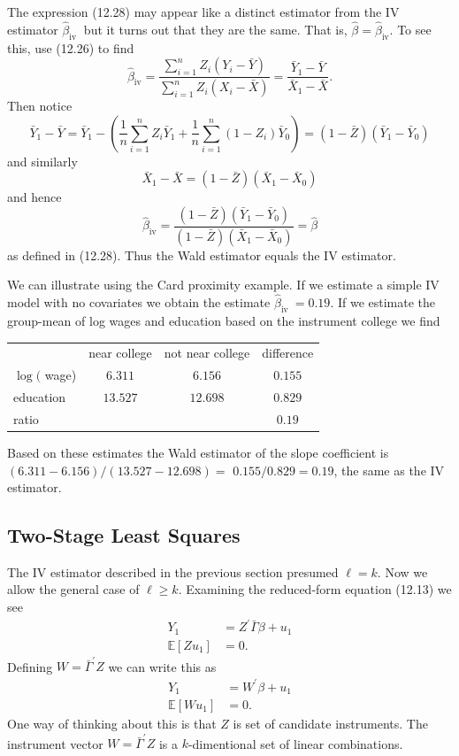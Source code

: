 \documentclass[10pt]{article}
\begin{document}
The expression (12.28) may appear like a distinct estimator from the IV estimator $\widehat{\beta}_{\text {iv }}$ but it turns out that they are the same. That is, $\widehat{\beta}=\widehat{\beta}_{\mathrm{iv}}$. To see this, use (12.26) to find
$$
\widehat{\beta}_{\mathrm{iv}}=\frac{\sum_{i=1}^{n} Z_{i}\left(Y_{i}-\bar{Y}\right)}{\sum_{i=1}^{n} Z_{i}\left(X_{i}-\bar{X}\right)}=\frac{\bar{Y}_{1}-\bar{Y}}{\bar{X}_{1}-\bar{X}} .
$$
Then notice
$$
\bar{Y}_{1}-\bar{Y}=\bar{Y}_{1}-\left(\frac{1}{n} \sum_{i=1}^{n} Z_{i} \bar{Y}_{1}+\frac{1}{n} \sum_{i=1}^{n}\left(1-Z_{i}\right) \bar{Y}_{0}\right)=(1-\bar{Z})\left(\bar{Y}_{1}-\bar{Y}_{0}\right)
$$
and similarly
$$
\bar{X}_{1}-\bar{X}=(1-\bar{Z})\left(\bar{X}_{1}-\bar{X}_{0}\right)
$$
and hence
$$
\widehat{\beta}_{\mathrm{iv}}=\frac{(1-\bar{Z})\left(\bar{Y}_{1}-\bar{Y}_{0}\right)}{(1-\bar{Z})\left(\bar{X}_{1}-\bar{X}_{0}\right)}=\widehat{\beta}
$$
as defined in (12.28). Thus the Wald estimator equals the IV estimator.

We can illustrate using the Card proximity example. If we estimate a simple IV model with no covariates we obtain the estimate $\widehat{\beta}_{\text {iv }}=0.19$. If we estimate the group-mean of log wages and education based on the instrument college we find

\begin{tabular}{lccc}
 & near college & not near college & difference \\
\cline { 3 - 4 }
$\log ($ wage) & $6.311$ & $6.156$ & $0.155$ \\
education & $13.527$ & $12.698$ & $0.829$ \\
\cline { 1 }\cline { 3 - 4 }
ratio &  &  & $0.19$ \\
\cline { 1 }\cline { 3 - 4 }
\end{tabular}

Based on these estimates the Wald estimator of the slope coefficient is $(6.311-6.156) /(13.527-12.698)=$ $0.155 / 0.829=0.19$, the same as the IV estimator.

\subsection{Two-Stage Least Squares}
The IV estimator described in the previous section presumed $\ell=k$. Now we allow the general case of $\ell \geq k$. Examining the reduced-form equation (12.13) we see
$$
\begin{aligned}
Y_{1} &=Z^{\prime} \bar{\Gamma} \beta+u_{1} \\
\mathbb{E}\left[Z u_{1}\right] &=0 .
\end{aligned}
$$
Defining $W=\bar{\Gamma}^{\prime} Z$ we can write this as
$$
\begin{aligned}
Y_{1} &=W^{\prime} \beta+u_{1} \\
\mathbb{E}\left[W u_{1}\right] &=0 .
\end{aligned}
$$
One way of thinking about this is that $Z$ is set of candidate instruments. The instrument vector $W=\bar{\Gamma}^{\prime} Z$ is a $k$-dimentional set of linear combinations.
\end{document}
